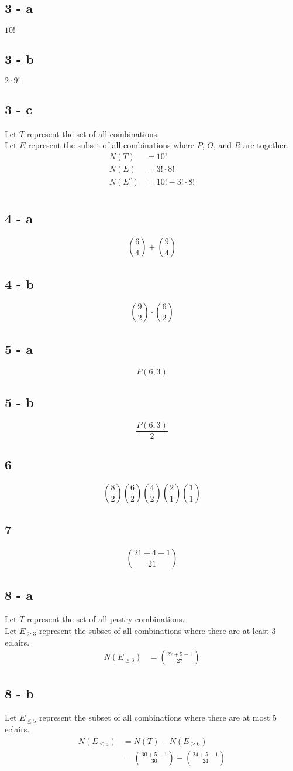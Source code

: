 \documentclass[12pt]{article}
\begin{document}
\subsection*{3 - a}
$10!$
\subsection*{3 - b}
$2\cdot 9!$
\subsection*{3 - c}
Let $T$ represent the set of all combinations. \\
Let $E$ represent the subset of all combinations where $P$, $O$, and $R$ are together. 
\begin{align*}
  N(T) &= 10! \\
  N(E) &= 3! \cdot 8! \\
  N(E^c) &= 10! - 3! \cdot 8! \\
\end{align*}
\subsection*{4 - a}
$$\binom{6}{4} + \binom{9}{4}$$
\subsection*{4 - b}
$$\binom{9}{2}\cdot\binom{6}{2}$$
\subsection*{5 - a}
$$P(6, 3)$$
\subsection*{5 - b}
$$\frac{P(6, 3)}{2}$$
\subsection*{6}
$$\binom{8}{2}\binom{6}{2}\binom{4}{2}\binom{2}{1}\binom{1}{1}$$
\subsection*{7}
$$\binom{21 + 4 - 1}{21}$$
\subsection*{8 - a}
Let $T$ represent the set of all pastry combinations. \\
Let $E_{\geq3}$ represent the subset of all combinations where there are at least 3 eclairs. \\
\begin{align*}
  N(E_{\geq3}) &= \binom{27+5-1}{27}
\end{align*}
\subsection*{8 - b}
Let $E_{\leq5}$ represent the subset of all combinations where there are at most 5 eclairs. \\
\begin{align*}
  N(E_{\leq5}) &= N(T) - N(E_{\geq6})\\
  &= \binom{30+5-1}{30} - \binom{24+5-1}{24}
\end{align*}
\end{document}
